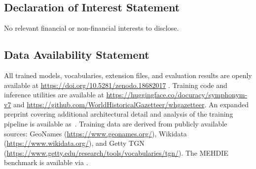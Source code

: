 \documentclass[11pt,a4paper]{article}
\begin{document}
\subsection*{Declaration of Interest Statement}

No relevant financial or non-financial interests to disclose.

\subsection*{Data Availability Statement}

All trained models, vocabularies, extension files, and evaluation results are openly available at \url{https://doi.org/10.5281/zenodo.18682017} \citep{symphonym2026zenodo}. Training code and inference utilities are available at \url{https://huggingface.co/docuracy/symphonym-v7} \citep{symphonym2026hf} and \url{https://github.com/WorldHistoricalGazetteer/whgazetteer}. An expanded preprint covering additional architectural detail and analysis of the training pipeline is available as~\citet{symphonym2026}. Training data are derived from publicly available sources: GeoNames (\url{https://www.geonames.org/}), Wikidata (\url{https://www.wikidata.org/}), and Getty TGN (\url{https://www.getty.edu/research/tools/vocabularies/tgn/}). The MEHDIE benchmark is available via \citet{mehdie2025}.







\clearpage
\end{document}
